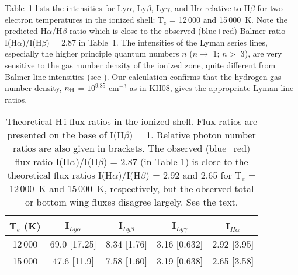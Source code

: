 \documentclass[a4paper,fleqn,usenatbib,useAMS]{mnras}
\def\ha{H{$\alpha$}}
\def\hb{H{$\beta$}}
\def\hi{H\,{\sc i}}
\begin{document}
{%



Table~\ref{tb2} lists the intensities for Ly$\alpha$, Ly$\beta$, Ly$\gamma$, and {\ha} relative to {\hb} for two electron temperatures in the ionized shell:  T$_{e}$ = 12\,000 and 15\,000~K.  Note the predicted {\ha}/{\hb} ratio which is close to the observed (blue+red) Balmer ratio I({\ha})/I({\hb}) = 2.87 in Table~1. The intensities of the Lyman series lines, especially the higher principle quantum numbers  $n$ ($n \rightarrow$ 1; $n >$ 3),  are very sensitive to the gas number density of the ionized zone, quite different from Balmer line intensities (see \citealt{leh00}). Our calculation confirms that the hydrogen gas number density, $n_{\rm H}$ = $10^{9.85}$ cm$^{-3}$ as in KH08, gives the appropriate Lyman line ratios.


\begin{table}
\caption{Theoretical {\hi} flux ratios in the ionized shell.
Flux ratios are presented on the base of I({\hb}) = 1.
Relative photon number ratios are also given in brackets.
The observed (blue+red) flux ratio I(\ha)/I(\hb) = 2.87 (in Table 1) is close to
the theoretical flux ratios I(\ha)/I(\hb) = 2.92 and 2.65 for T$_e$ = 12\,000~K and 15\,000~K, respectively, but the observed total or bottom wing fluxes disagree largely. See the text.}
\vspace{-0.5cm}
\begin{tabular}{ccccc}\\
\hline \hline

T$_{e}$ (K) & I$_{Ly\alpha}$ & I$_{Ly\beta}$ & I$_{Ly\gamma}$ & I$_{H\alpha}$ \\

\hline
12\,000      &  69.0 [17.25]    &  8.34 [1.76]    &  3.16 [0.632]    &  2.92 [3.95]  \\
15\,000      &  47.6 [11.9]     &  7.58 [1.60]    &  3.19 [0.638]    &  2.65 [3.58]   \\
\hline

\end{tabular} \\
\label{tb2}
\end{table}

}
\end{document}
